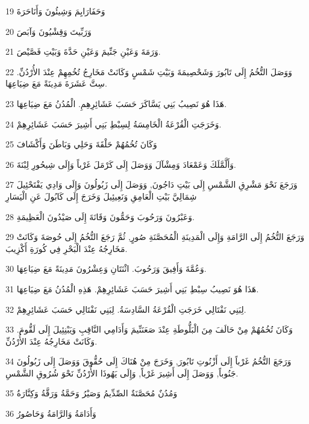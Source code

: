 \par 19 وَحَفَارَايِمَ وَشِيئُونَ وَأَنَاحَرَةَ
\par 20 وَرَبِّيتَ وَقِشْيُونَ وَآبَصَ
\par 21 وَرَمَةَ وَعَيْنِ جَنِّيمَ وَعَيْنِ حَدَّةَ وَبَيْتِ فَصَّيْصَ.
\par 22 وَوَصَلَ التُّخُمُ إِلَى تَابُورَ وَشَحْصِيمَةَ وَبَيْتِ شَمْسٍ وَكَانَتْ مَخَارِجُ تُخُمِهِمْ عِنْدَ الأُرْدُنِّ. سِتَّ عَشَرَةَ مَدِينَةً مَعَ ضِيَاعِهَا.
\par 23 هَذَا هُوَ نَصِيبُ بَنِي يَسَّاكَرَ حَسَبَ عَشَائِرِهِمِ. الْمُدُنُ مَعَ ضِيَاعِهَا.
\par 24 وَخَرَجَتِ الْقُرْعَةُ الْخَامِسَةُ لِسِبْطِ بَنِي أَشِيرَ حَسَبَ عَشَائِرِهِمْ.
\par 25 وَكَانَ تُخُمُهُمْ حَلْقَةَ وَحَلِي وَبَاطَنَ وَأَكْشَافَ
\par 26 وَأَلَّمَّلَكَ وَعَمْعَادَ وَمِشْآلَ وَوَصَلَ إِلَى كَرْمَلَ غَرْباً وَإِلَى شِيحُورِ لِبْنَةَ.
\par 27 وَرَجَعَ نَحْوَ مَشْرِقِ الشَّمْسِ إِلَى بَيْتِ دَاجُونَ, وَوَصَلَ إِلَى زَبُولُونَ وَإِلَى وَادِي يَفْتَحْئِيلَ شِمَالِيَّ بَيْتِ الْعَامِقِ وَنَعِيئِيلَ وَخَرَجَ إِلَى كَابُولَ عَنِ الْيَسَارِ
\par 28 وَعَبْرُونَ وَرَحُوبَ وَحَمُّونَ وَقَانَةَ إِلَى صَيْدُونَ الْعَظِيمَةِ.
\par 29 وَرَجَعَ التُّخُمُ إِلَى الرَّامَةِ وَإِلَى الْمَدِينَةِ الْمُحَصَّنَةِ صُورٍ, ثُمَّ رَجَعَ التُّخُمُ إِلَى حُوصَةَ وَكَانَتْ مَخَارِجُهُ عِنْدَ الْبَحْرِ فِي كُورَةِ أَكْزِيبَ.
\par 30 وَعُمَّةَ وَأَفِيقَ وَرَحُوبَ. اثْنَتَانِ وَعِشْرُونَ مَدِينَةً مَعَ ضِيَاعِهَا.
\par 31 هَذَا هُوَ نَصِيبُ سِبْطِ بَنِي أَشِيرَ حَسَبَ عَشَائِرِهِمْ. هَذِهِ الْمُدُنُ مَعَ ضِيَاعِهَا.
\par 32 لِبَنِي نَفْتَالِي خَرَجَتِ الْقُرْعَةُ السَّادِسَةُ. لِبَنِي نَفْتَالِي حَسَبَ عَشَائِرِهِمْ.
\par 33 وَكَانَ تُخُمُهُمْ مِنْ حَالَفَ مِنَ الْبَلُّوطَةِ عِنْدَ صَعَنَنِّيمَ وَأَدَامِي النَّاقِبِ وَيَبْنِئِيلَ إِلَى لَقُّومَ. وَكَانَتْ مَخَارِجُهُ عِنْدَ الأُرْدُنِّ.
\par 34 وَرَجَعَ التُّخُمُ غَرْباً إِلَى أَزْنُوتِ تَابُورَ, وَخَرَجَ مِنْ هُنَاكَ إِلَى حُقُّوقَ وَوَصَلَ إِلَى زَبُولُونَ جَنُوباً, وَوَصَلَ إِلَى أَشِيرَ غَرْباً, وَإِلَى يَهُوذَا الأُرْدُنِّ نَحْوَ شُرُوقِ الشَّمْسِ.
\par 35 وَمُدُنٌ مُحَصَّنَةٌ الصِّدِّيمُ وَصَيْرُ وَحَمَّةُ وَرَقَّةُ وَكِنَّارَةُ
\par 36 وَأَدَامَةُ وَالرَّامَةُ وَحَاصُورُ
